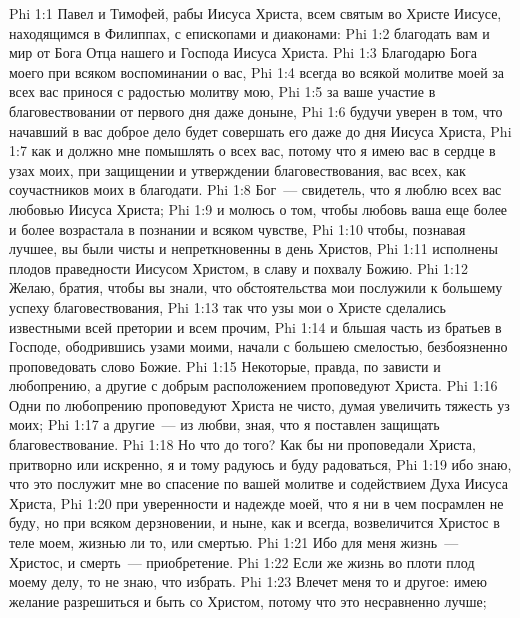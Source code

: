 \vs Phi 1:1 Павел и Тимофей, рабы Иисуса Христа, всем святым во Христе Иисусе, находящимся в Филиппах, с епископами и диаконами:
\vs Phi 1:2 благодать вам и мир от Бога Отца нашего и Господа Иисуса Христа.
\rsbpar\vs Phi 1:3 Благодарю Бога моего при всяком воспоминании о вас,
\vs Phi 1:4 всегда во всякой молитве моей за всех вас принося с радостью молитву мою,
\vs Phi 1:5 за ваше участие в благовествовании от первого дня даже доныне,
\vs Phi 1:6 будучи уверен в том, что начавший в вас доброе дело будет совершать его даже до дня Иисуса Христа,
\vs Phi 1:7 как и должно мне помышлять о всех вас, потому что я имею вас в сердце в узах моих, при защищении и утверждении благовествования, вас всех, как соучастников моих в благодати.
\vs Phi 1:8 Бог~--- свидетель, что я люблю всех вас любовью Иисуса Христа;
\vs Phi 1:9 и молюсь о том, чтобы любовь ваша еще более и более возрастала в познании и всяком чувстве,
\vs Phi 1:10 чтобы, познавая лучшее, вы были чисты и непреткновенны в день Христов,
\vs Phi 1:11 исполнены плодов праведности Иисусом Христом, в славу и похвалу Божию.
\rsbpar\vs Phi 1:12 Желаю, братия, чтобы вы знали, что обстоятельства мои послужили к большему успеху благовествования,
\vs Phi 1:13 так что узы мои о Христе сделались известными всей претории и всем прочим,
\vs Phi 1:14 и бльшая часть из братьев в Господе, ободрившись узами моими, начали с большею смелостью, безбоязненно проповедовать слово Божие.
\vs Phi 1:15 Некоторые, правда, по зависти и любопрению, а другие с добрым расположением проповедуют Христа.
\vs Phi 1:16 Одни по любопрению проповедуют Христа не чисто, думая увеличить тяжесть уз моих;
\vs Phi 1:17 а другие~--- из любви, зная, что я поставлен защищать благовествование.
\vs Phi 1:18 Но что до того? Как бы ни проповедали Христа, притворно или искренно, я и тому радуюсь и буду радоваться,
\vs Phi 1:19 ибо знаю, что это послужит мне во спасение по вашей молитве и содействием Духа Иисуса Христа,
\vs Phi 1:20 при уверенности и надежде моей, что я ни в чем посрамлен не буду, но при всяком дерзновении, и ныне, как и всегда, возвеличится Христос в теле моем, жизнью ли то, или смертью.
\vs Phi 1:21 Ибо для меня жизнь~--- Христос, и смерть~--- приобретение.
\vs Phi 1:22 Если же жизнь во плоти  плод моему делу, то не знаю, что избрать.
\vs Phi 1:23 Влечет меня то и другое: имею желание разрешиться и быть со Христом, потому что это несравненно лучше;
